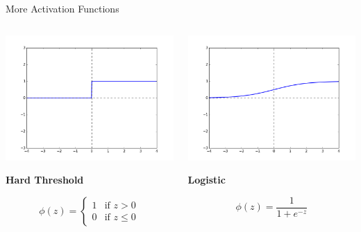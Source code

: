 \documentclass[11pt,handout,aspectratio=169]{beamer}
\begin{document}
\begin{frame}{More Activation Functions}
  \begin{columns}
    \begin{column}{0.3 \linewidth}
      \includegraphics[width=\linewidth]{pics/act_threshold.png}
      \begin{center}
        {\bf Hard Threshold}
      \end{center}
      \[ \phi(z) = \left\{ \begin{array}{ll} 1 & \textrm{if } z > 0 \\ 0 & \textrm{if } z \leq 0 \end{array} \right. \]
    \end{column}

    \begin{column}{0.3 \linewidth}
      \includegraphics[width=\linewidth]{pics/act_logistic.png}
      \begin{center}
        {\bf Logistic}
      \end{center}
      \[ \phi(z) = \frac{1}{1+e^{-z}} \]
    \end{column}


\end{columns}
\end{frame}
\end{document}
